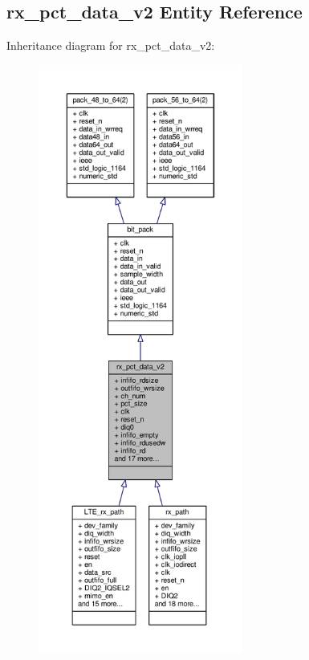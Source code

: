 \subsection{rx\+\_\+pct\+\_\+data\+\_\+v2 Entity Reference}
\label{classrx__pct__data__v2}


Inheritance diagram for rx\+\_\+pct\+\_\+data\+\_\+v2\+:\nopagebreak
\begin{figure}[H]
\begin{center}
\leavevmode
\includegraphics[height=550pt]{d0/d69/classrx__pct__data__v2__inherit__graph}
\end{center}
\end{figure}


